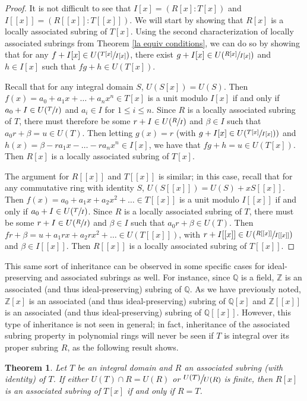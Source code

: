 \documentclass[12pt]{amsart}
\newtheorem{theorem}{Theorem}[section]
\theoremstyle{definition}
\newcommand{\bZ}{\mathbb Z}
\newcommand{\bQ}{\mathbb Q}
\newcommand{\quot}[2]{\large\sfrac{#1}{#2}\normalsize}
\begin{document}
	\begin{proof}
		It is not difficult to see that $I[x]=(R[x]:T[x])$ and $I[[x]]=(R[[x]]:T[[x]])$. We will start by showing that $R[x]$ is a locally associated subring of $T[x]$. Using the second characterization of locally associated subrings from Theorem \ref{la equiv conditions}, we can do so by showing that for any $f+I[x]\in U(\sfrac{T[x]}{I[x]})$, there exist $g+I[x]\in U(\sfrac{R[x]}{I[x]})$ and $h\in I[x]$ such that $fg+h\in U(T[x])$.
		
		Recall that for any integral domain $S$, $U(S[x])=U(S)$. Then $f(x)=a_0+a_1x+\dots+a_nx^n\in T[x]$ is a unit modulo $I[x]$ if and only if $a_0+I\in U(\sfrac{T}{I})$ and $a_i\in I$ for $1\leq i\leq n$. Since $R$ is a locally associated subring of $T$, there must therefore be some $r+I\in U(\sfrac{R}{I})$ and $\beta\in I$ such that $a_0r+\beta=u\in U(T)$. Then letting $g(x)=r$ (with $g+I[x]\in U(\sfrac{T[x]}{I[x]}))$ and $h(x)=\beta-ra_1x-\dots-ra_nx^n\in I[x]$, we have that $fg+h=u\in U(T[x])$. Then $R[x]$ is a locally associated subring of $T[x]$.
		
		The argument for $R[[x]]$ and $T[[x]]$ is similar; in this case, recall that for any commutative ring with identity $S$, $U(S[[x]])=U(S)+xS[[x]]$. Then $f(x)=a_0+a_1x+a_2x^2+\dots\in T[[x]]$ is a unit modulo $I[[x]]$ if and only if $a_0+I\in U(\sfrac{T}{I})$. Since $R$ is a locally associated subring of $T$, there must be some $r+ I\in U(\sfrac{R}{I})$ and $\beta\in I$ such that $a_0r+\beta\in U(T)$. Then $fr+\beta=u+a_1rx+a_2rx^2+\dots\in U(T[[x]])$, with $r+I[[x]]\in U(\sfrac{R[[x]]}{I[[x]]})$ and $\beta\in I[[x]]$. Then $R[[x]]$ is a locally associated subring of $T[[x]]$.
	\end{proof}
	
	This same sort of inheritance can be observed in some specific cases for ideal-preserving and associated subrings as well. For instance, since $\bQ$ is a field, $\bZ$ is an associated (and thus ideal-preserving) subring of $\bQ$. As we have previously noted, $\bZ[x]$ is an associated (and thus ideal-preserving) subring of $\bQ[x]$ and $\bZ[[x]]$ is an associated (and thus ideal-preserving) subring of $\bQ[[x]]$. However, this type of inheritance is not seen in general; in fact, inheritance of the associated subring property in polynomial rings will never be seen if $T$ is integral over its proper subring $R$, as the following result shows.
	
	\begin{theorem}
		\label{poly not associated}
		Let $T$ be an integral domain and $R$ an associated subring (with identity) of $T$. If either $U(T)\cap R=U(R)$ or $\quot{U(T)}{U(R)}$ is finite, then $R[x]$ is an associated subring of $T[x]$ if and only if $R=T$.
	\end{theorem}
	
\end{document}
